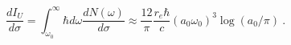 \begin{equation}\label{ct99-14}
\frac{dI_U}{d\sigma}=\int _{\omega _0}^{\infty}\hbar d\omega \frac{dN(\omega)}{d\sigma}\approx \frac{12}{\pi}\frac{r_e \hbar}{c}(a_0\omega _0)^3\log (a_0/\pi)~.
\end{equation}

